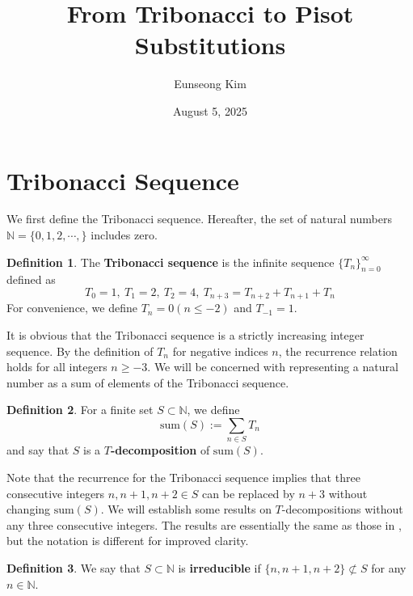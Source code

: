 \documentclass{article}
\title{\textbf{From Tribonacci to Pisot Substitutions}}
\author{Eunseong Kim}
\date{August 5, 2025}
\theoremstyle{definition}
\newtheorem*{definition}{Definition}
\begin{document}
\maketitle

\section{Tribonacci Sequence}
\label{sec1}

We first define the Tribonacci sequence. Hereafter, the set of natural numbers $\mathbb{N}=\{0,1,2,\cdots,\}$ includes zero.

\begin{definition}
The \textbf{Tribonacci sequence} is the infinite sequence $\{T_n \}_{n=0}^{\infty}$ defined as
\[T_0 = 1,\ T_1=2,\ T_2=4,\ T_{n+3}=T_{n+2}+T_{n+1}+T_n\]
For convenience, we define $T_{n}=0(n\leq -2)$ and $T_{-1}=1$.
\end{definition}

It is obvious that the Tribonacci sequence is a strictly increasing integer sequence. By the definition of $T_n$ for negative indices $n$, the recurrence relation holds for all integers $n\geq -3$. We will be concerned with representing a natural number as a sum of elements of the Tribonacci sequence.

\begin{definition} For a finite set $S\subset \mathbb{N}$, we define
\[\text{sum}(S):=\sum_{n\in S} T_n\]
and say that $S$ is a \textbf{$T$-decomposition} of $\text{sum}(S)$.
\end{definition}

Note that the recurrence for the Tribonacci sequence implies that three consecutive integers $n, n+1, n+2\in S$ can be replaced by $n+3$ without changing $\text{sum}(S)$. We will establish some results on $T$-decompositions without any three consecutive integers. The results are essentially the same as those in \cite{cow}, but the notation is different for improved clarity.

\begin{definition}
We say that $S\subset \mathbb{N}$ is \textbf{irreducible} if $\{n,n+1,n+2\} \not\subset S$ for any $n\in \mathbb{N}$.
\end{definition}
\end{document}
